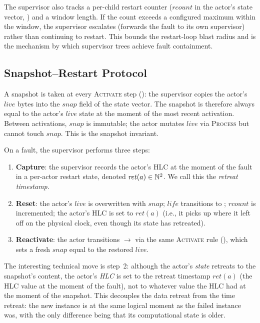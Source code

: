The supervisor also tracks a per-child restart counter
(\(\mathit{rcount}\) in the actor's state vector,
) and a window length.  If the count exceeds a
configured maximum within the window, the supervisor escalates
(forwards the fault to its own supervisor) rather than continuing to
restart.  This bounds the restart-loop blast radius and is the
mechanism by which supervisor trees achieve fault containment.

\subsection{Snapshot--Restart Protocol}
\label{sec:supervision:restart}

A snapshot is taken at every \textsc{Activate} step
(): the supervisor copies the actor's
\(\mathit{live}\) bytes into the \(\mathit{snap}\) field of the state
vector.  The snapshot is therefore always equal to the actor's
\(\mathit{live}\) state at the moment of the most recent activation.
Between activations, \(\mathit{snap}\) is immutable; the actor mutates
\(\mathit{live}\) via \textsc{Process} but cannot touch
\(\mathit{snap}\).  This is the snapshot invariant.

On a fault, the supervisor performs three steps:

\begin{enumerate}
\item \textbf{Capture}: the supervisor records the actor's HLC at the
moment of the fault in a per-actor restart state, denoted
\(\mathit{ret}(a) \in \mathbb{N}^2\).  We call this the \emph{retreat
timestamp}.

\item \textbf{Reset}: the actor's \(\mathit{live}\) is overwritten
with \(\mathit{snap}\); \(\mathit{life}\) transitions to
\Initializing{}; \(\mathit{rcount}\) is incremented; the actor's
HLC is set to \(\mathit{ret}(a)\) (i.e., it picks up where it left
off on the physical clock, even though its state has retreated).

\item \textbf{Reactivate}: the actor transitions \Initializing{}
\(\to\) \Active{} via the same \textsc{Activate} rule
(), which sets a fresh \(\mathit{snap}\) equal to
the restored \(\mathit{live}\).
\end{enumerate}

The interesting technical move is step~2: although the actor's
\emph{state} retreats to the snapshot's content, the actor's
\emph{HLC} is set to the retreat timestamp \(\mathit{ret}(a)\) (the
HLC value at the moment of the fault), not to whatever value the
HLC had at the moment of the snapshot.  This decouples the data
retreat from the time retreat: the new instance is at the same
logical moment as the failed instance was, with the only difference
being that its computational state is older.

